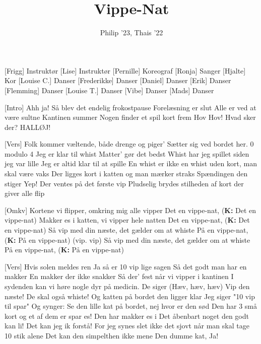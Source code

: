 \documentclass[a4paper,11pt]{article}
\title{Vippe-Nat}
\author{Philip '23, Thais '22}
\begin{document}
\maketitle

\begin{roles}
[Frigg] Instruktør
[Lise] Instruktør
[Pernille] Koreograf
[Ronja] Sanger
[Hjalte] Kor
[Louise C.] Danser
[Frederikke] Danser
[Daniel] Danser
[Erik] Danser
[Flemming] Danser
[Louise T.] Danser
[Vibe] Danser
[Mads] Danser
\end{roles}

\begin{song}
[Intro] Ahh ja!
                Så blev det endelig frokostpause
                Forelæsning er slut
                Alle er ved at være sultne
                Kantinen summer
                Nogen finder et spil kort frem
                Hov Hov! Hvad sker der?
                HALLØJ!
    
    [Vers] Folk kommer væltende, både drenge og piger'
                Sætter sig ved bordet her. 0 modulo 4
                Jeg er klar til whist
                Matter' gør det bedst
                Whist har jeg spillet siden jeg var lille 
                Jeg er altid klar til at spille
                En whist er ikke en whist uden kort, man skal være vaks
                Der ligges kort i katten og man mærker straks
                Spændingen den stiger
                Yep!
                Der ventes på det første vip
                Pludselig brydes stilheden af kort der giver alle flip

    [Omkv] Kortene vi flipper, omkring mig alle vipper
                Det en vippe-nat, (\textbf{K:} Det en vippe-nat)
                Makker es i katten, vi vipper hele natten
                Det en vippe-nat, (\textbf{K:} Det en vippe-nat)
                Så vip med din næste, det gælder om at whiste
                På en vippe-nat, (\textbf{K:} På en vippe-nat) (vip. vip)
                Så vip med din næste, det gælder om at whiste
                På en vippe-nat, (\textbf{K:} På en vippe-nat)

    [Vers] Hvis solen meldes ren
                Ja så er 10 vip lige sagen
                Så det godt man har en makker 
                En makker der ikke snakker
                Så der' fest når vi vipper i kantinen 
                I sydenden kan vi høre nogle dyr på medicin. 
                De siger (Hæv, hæv, hæv)
                Vip den næste!
                De skal også whiste!
                Og katten på bordet den ligger klar
                Jeg siger "10 vip til spar"
                Og synger:
                Se den lille kat på bordet, nej hvor er den sød
                Den har 3 små kort og et af dem er spar es!
                Den har makker es i
                Det åbenbart noget den godt kan li!
                Det kan jeg ik forstå!
                For jeg synes slet ikke det sjovt når man skal tage 10 stik alene 
                Det kan den simpelthen ikke mene
                Den dumme kat, Ja!


\end{song}
\end{document}
